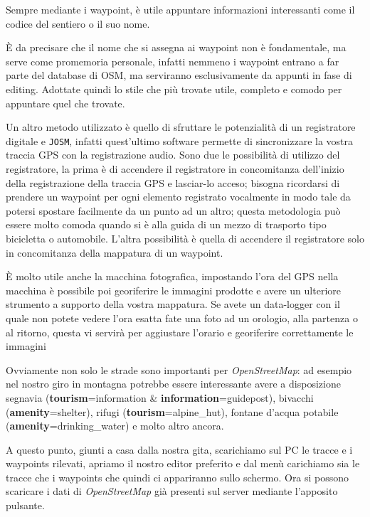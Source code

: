 \documentclass[a4paper,twoside,12pt,]{article}
\newcommand{\osm}{\emph{OpenStreetMap}\xspace}
\newcommand{\gps}{GPS\xspace}
\newcommand{\key}[1]{\textsf{\textbf{#1}}}
\newcommand{\val}[1]{\textsf{#1}}
\newcommand{\soft}[1]{\texttt{#1}}
\begin{document}
Sempre mediante i waypoint, è utile appuntare informazioni interessanti come il codice del sentiero o il suo nome.

È da precisare che il nome che si assegna ai waypoint non è fondamentale, ma serve come promemoria personale, infatti nemmeno i waypoint entrano a far parte del database di OSM, ma serviranno esclusivamente da appunti in fase di editing. Adottate quindi lo stile che più trovate utile, completo e comodo per appuntare quel che trovate.

Un altro metodo utilizzato è quello di sfruttare le potenzialità di un registratore digitale e \soft{JOSM}, infatti quest'ultimo software permette di sincronizzare la vostra traccia \gps con la registrazione audio. Sono due le possibilità di utilizzo del registratore, la prima è di accendere il registratore in concomitanza dell'inizio della registrazione della traccia \gps e lasciar-lo acceso; bisogna ricordarsi di prendere un waypoint per ogni elemento registrato vocalmente in modo tale da potersi spostare facilmente da un punto ad un altro; questa metodologia può essere molto comoda quando si è alla guida di un mezzo di trasporto tipo bicicletta o automobile. L'altra possibilità è quella di accendere il registratore solo in concomitanza della mappatura di un waypoint.

È molto utile anche la macchina fotografica, impostando l'ora del GPS nella macchina è possibile poi georiferire le immagini prodotte e avere un ulteriore strumento a supporto della vostra mappatura. Se avete un data-logger con il quale non potete vedere l'ora esatta fate una foto ad un orologio, alla partenza o al ritorno, questa vi servirà per aggiustare l'orario e georiferire correttamente le immagini

Ovviamente non solo le strade sono importanti per \osm: ad esempio nel nostro giro in montagna potrebbe essere interessante avere a disposizione segnavia (\key{tourism}=\val{information} \& \key{information}=\val{guidepost}), bivacchi (\key{amenity}=\val{shelter}), rifugi (\key{tourism}=\val{alpine\_hut}), fontane d'acqua potabile (\key{amenity}=\val{drinking\_water}) e molto altro ancora.

A questo punto, giunti a casa dalla nostra gita, scarichiamo sul PC le tracce e i waypoints rilevati, apriamo il nostro editor preferito e dal menù carichiamo sia le tracce che i waypoints che quindi ci appariranno sullo schermo. Ora si possono scaricare i dati di \osm già presenti sul server mediante l'apposito pulsante.
\end{document}
